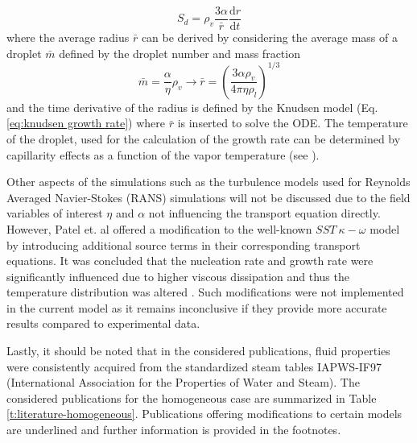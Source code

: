 \documentclass[12pt]{article}
\numberwithin{equation}{section}
\begin{document}
\begin{equation}
    S_{d}=\rho_{v}\frac{3\alpha}{\bar{r}}\frac{\mathrm{d}r}{\mathrm{d}t}
\end{equation}
where the average radius $\bar{r}$ can be derived by considering the average mass of a droplet $\bar{m}$ defined by the droplet number and mass fraction
\begin{equation}\label{eq:average_radius}
    \bar{m}=\frac{\alpha}{\eta}\rho_{v} \rightarrow \bar{r}=\left(\frac{3\alpha\rho_{v}}{4\pi\eta\rho_{l}}\right)^{1/3}   
\end{equation}
and the time derivative of the radius is defined by the Knudsen model (Eq. \ref{eq:knudsen growth rate}) where $\bar{r}$ is inserted to solve the ODE. The temperature of the droplet, used for the calculation of the growth rate can be determined by capillarity effects as a function of the vapor temperature (see \cite{gerber2004pressure}). 

Other aspects of the simulations such as the turbulence models used for Reynolds Averaged Navier-Stokes (RANS) simulations will not be discussed due to the field variables of interest $\eta$ and $\alpha$ not influencing the transport equation directly. However, Patel et. al \cite{patel2016influence} offered a modification to the well-known $SST\:\kappa-\omega$ model by introducing additional source terms in their corresponding transport equations. It was concluded that the nucleation rate and growth rate were significantly influenced due to higher viscous dissipation and thus the temperature distribution was altered \cite{patel2016influence}. Such modifications were not implemented in the current model as it remains inconclusive if they provide more accurate results compared to experimental data.

Lastly, it should be noted that in the considered publications, fluid properties were consistently acquired from the standardized steam tables IAPWS-IF97 (International Association for the Properties of Water and Steam). The considered publications for the homogeneous case are summarized in Table \ref{t:literature-homogeneous}. Publications offering modifications to certain models are underlined and further information is provided in the footnotes.
\end{document}
